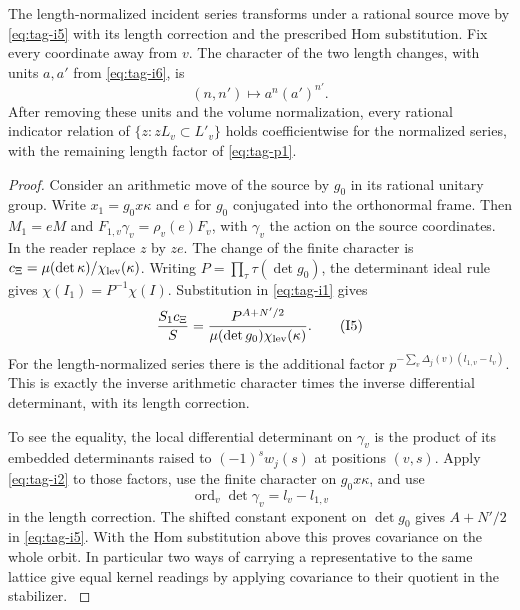 \begin{proposition}\label{prop:incident-covariance}
The length-normalized incident series transforms under a rational
source move by \textup{\eqref{eq:tag-i5}} with its length correction and the
prescribed Hom substitution. Fix every coordinate away from \(v\). The character of the two length changes, with units \(a,a'\) from \textup{\eqref{eq:tag-i6}}, is
\[
 (n,n')\longmapsto a^n(a')^{n'}.
\]
 After removing
these units and the volume normalization, every rational indicator
relation of \(\{z:zL_v\subset L'_v\}\) holds coefficientwise for
the normalized series, with the remaining length factor of \textup{\eqref{eq:tag-p1}}.
\end{proposition}

\begin{proof}

Consider
an arithmetic move of the source by \(g_0\) in its rational
unitary group. Write \(x_1=g_0 x\kappa\) and \(e\) for \(g_0\)
conjugated into the orthonormal frame. Then \(M_1=eM\) and
\(F_{1,v}\gamma_v=\rho_v(e)F_v\), with \(\gamma_v\) the action
on the source coordinates. In the reader replace \(z\) by \(ze\).
The change of the finite character is
\(c_\Xi=\mu(\det\kappa)/\chi_{\rm lev}(\kappa)\).
Writing \(P=\prod_\tau \tau(\det g_0)\), the determinant ideal
rule gives \(\chi(I_1)=P^{-1}\chi(I)\).
Substitution in \eqref{eq:tag-i1} gives
\[
 \frac{S_1 c_\Xi}{S}
   =\frac{P^{A+N'/2}}{\mu(\det g_0)\chi_{\rm lev}(\kappa)} .
 \tag{I5}\label{eq:tag-i5}
\]
For the length-normalized series there is the additional factor
\(p^{-\sum_v\Delta_j(v)(l_{1,v}-l_v)}\).
This is exactly the inverse arithmetic character times the
inverse differential determinant, with its length correction.

To see the equality, the local differential determinant on
\(\gamma_v\) is the product of its embedded determinants raised
to \((-1)^s w_j(s)\) at positions \((v,s)\). Apply \eqref{eq:tag-i2} to
those factors, use the finite character on \(g_0 x\kappa\),
and use 
\[
  \operatorname{ord}_v\det\gamma_v=l_v-l_{1,v}
\]
in the length correction. The shifted constant exponent on
\(\det g_0\) gives \(A+N'/2\) in \eqref{eq:tag-i5}. With the Hom
substitution above this proves covariance on the whole orbit.
In particular two ways of carrying a representative to the
same lattice give equal kernel readings by applying covariance
to their quotient in the stabilizer. \label{cor:incident-sections-3}


\end{proof}
